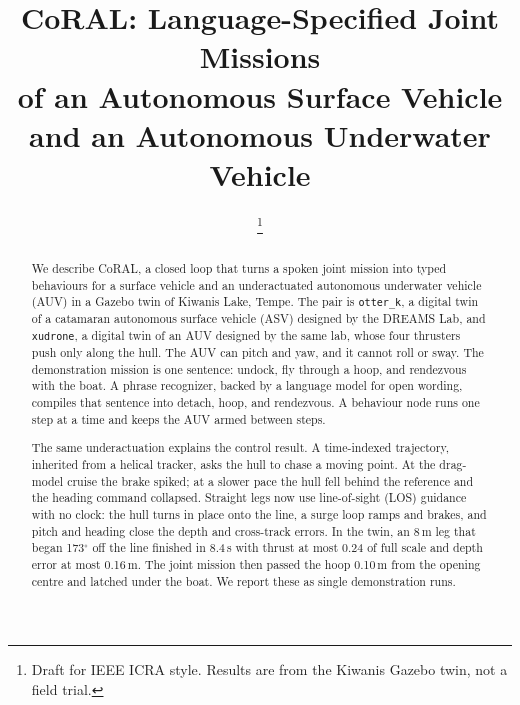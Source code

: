 \documentclass[conference]{IEEEtran}
\def\CoRAL{CoRAL}
\def\otterk{\texttt{otter\_k}}
\def\xudrone{\texttt{xudrone}}
\begin{document}
\title{CoRAL: Language-Specified Joint Missions\\
of an Autonomous Surface Vehicle\\
and an Autonomous Underwater Vehicle}

\author{
\thanks{Draft for IEEE ICRA style. Results are from the Kiwanis Gazebo twin, not a field trial.}}

\maketitle

\begin{abstract}
We describe \CoRAL{}, a closed loop that turns a spoken joint mission into typed behaviours for a surface vehicle and an underactuated autonomous underwater vehicle (AUV) in a Gazebo twin of Kiwanis Lake, Tempe. The pair is \otterk{}, a digital twin of a catamaran autonomous surface vehicle (ASV) designed by the DREAMS Lab, and \xudrone{}, a digital twin of an AUV designed by the same lab, whose four thrusters push only along the hull. The AUV can pitch and yaw, and it cannot roll or sway. The demonstration mission is one sentence: undock, fly through a hoop, and rendezvous with the boat. A phrase recognizer, backed by a language model for open wording, compiles that sentence into detach, hoop, and rendezvous. A behaviour node runs one step at a time and keeps the AUV armed between steps.

The same underactuation explains the control result. A time-indexed trajectory, inherited from a helical tracker, asks the hull to chase a moving point. At the drag-model cruise the brake spiked; at a slower pace the hull fell behind the reference and the heading command collapsed. Straight legs now use line-of-sight (LOS) guidance with no clock: the hull turns in place onto the line, a surge loop ramps and brakes, and pitch and heading close the depth and cross-track errors. In the twin, an 8\,m leg that began 173$^\circ$ off the line finished in 8.4\,s with thrust at most 0.24 of full scale and depth error at most 0.16\,m. The joint mission then passed the hoop 0.10\,m from the opening centre and latched under the boat. We report these as single demonstration runs.
\end{abstract}
\end{document}
